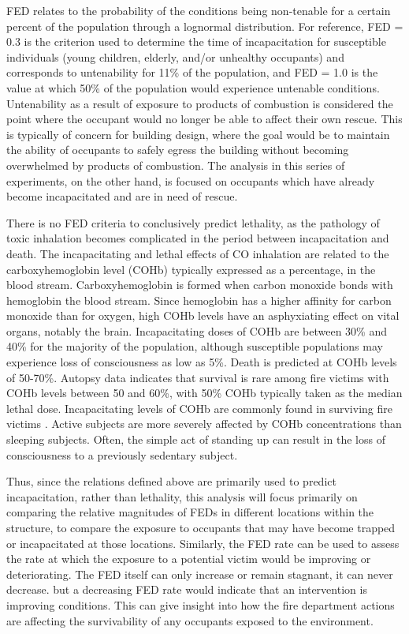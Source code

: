 \documentclass[12pt,oneside]{article}
\begin{document}
FED relates to the probability of the conditions being non-tenable for a certain percent of the population through a lognormal distribution.  For reference, FED = 0.3 is the criterion used to determine the time of incapacitation for susceptible individuals (young children, elderly, and/or unhealthy occupants) and corresponds to untenability for 11\% of the population, and FED = 1.0 is the value at which 50\% of the population would experience untenable conditions. Untenability as a result of exposure to products of combustion is considered the point where the occupant would no longer be able to affect their own rescue. This is typically of concern for building design, where the goal would be to maintain the ability of occupants to safely egress the building without becoming overwhelmed by products of combustion. The analysis in this series of experiments, on the other hand, is focused on occupants which have already become incapacitated and are in need of rescue. 

There is no FED criteria to conclusively predict lethality, as the pathology of toxic inhalation becomes complicated in the period between incapacitation and death. The incapacitating and lethal effects of CO inhalation are related to the carboxyhemoglobin level (COHb) typically expressed as a percentage, in the blood stream. Carboxyhemoglobin is formed when carbon monoxide bonds with hemoglobin the blood stream. Since hemoglobin has a higher affinity for carbon monoxide than for oxygen, high COHb levels have an asphyxiating effect on vital organs, notably the brain. Incapacitating doses of COHb are between 30\% and 40\% for the majority of the population, although susceptible populations may experience loss of consciousness as low as 5\%. Death is predicted at COHb levels of 50-70\%. Autopsy data indicates that survival is rare among fire victims with COHb levels between 50 and 60\%, with 50\% COHb typically taken as the median lethal dose. Incapacitating levels of COHb are commonly found in surviving fire victims \cite{SFPE:Purser}. Active subjects are more severely affected by COHb concentrations than sleeping subjects. Often, the simple act of standing up can result in the loss of consciousness to a previously sedentary subject. 

Thus, since the relations defined above are primarily used to predict incapacitation, rather than lethality, this analysis will focus primarily on comparing the relative magnitudes of FEDs in different locations within the structure, to compare the exposure to occupants that may have become trapped or incapacitated at those locations. Similarly, the FED rate can be used to assess the rate at which the exposure to a potential victim would be improving or deteriorating. The FED itself can only increase or remain stagnant, it can never decrease. but a decreasing FED rate would indicate that an intervention is improving conditions. This can give insight into how the fire department actions are affecting the survivability of any occupants exposed to the environment.
\end{document}
